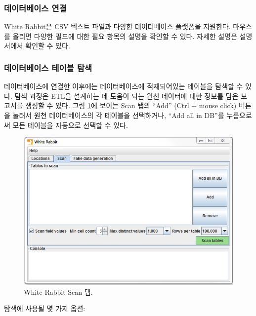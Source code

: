 \documentclass[10.5pt]{book}
\theoremstyle{definition}
\theoremstyle{definition}
\theoremstyle{definition}
\theoremstyle{remark}
\begin{document}
\subsubsection*{데이터베이스 연결}\label{-}

White Rabbit은 CSV 텍스트 파일과 다양한 데이터베이스 플랫폼을 지원한다.
마우스를 올리면 다양한 필드에 대한 필요 항목의 설명을 확인할 수 있다.
자세한 설명은 설명서에서 확인할 수 있다.

\subsubsection*{데이터베이스 테이블 탐색}\label{--}

데이터베이스에 연결한 이후에는 데이터베이스에 적재되어있는 테이블을
탐색할 수 있다. 탐색 과정은 ETL을 설계하는 데 도움이 되는 원천 데이터에
대한 정보를 담은 보고서를 생성할 수 있다. 그림
\ref{fig:WhiteRabbitAddTables}에 보이는 Scan 탭의 ``Add'' (Ctrl + mouse
click) 버튼을 눌러서 원천 데이터베이스의 각 테이블을 선택하거나, ``Add
all in DB''를 누름으로써 모든 테이블을 자동으로 선택할 수 있다.

\begin{figure}

{\centering \includegraphics[width=1\linewidth]{images/ExtractTransformLoad/WhiteRabbitAddTables} 

}

\caption{White Rabbit Scan 탭.}\label{fig:WhiteRabbitAddTables}
\end{figure}

탐색에 사용될 몇 가지 옵션:
\end{document}
